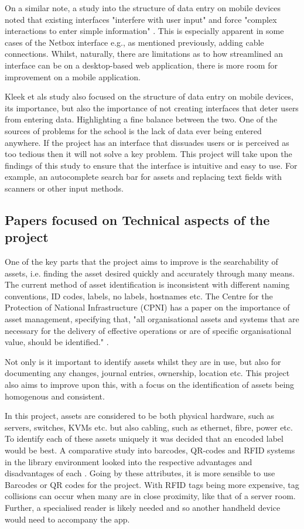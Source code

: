 \documentclass [11pt,a4paper]{article}
\begin{document}
On a similar note, a study into the structure of data entry on mobile devices noted that existing interfaces "interfere with user input" and force "complex interactions to enter simple information" \cite{van2007gui}. This is especially apparent in some cases of the Netbox interface e.g., as mentioned previously, adding cable connections. Whilst, naturally, there are limitations as to how streamlined an interface can be on a desktop-based web application, there is more room for improvement on a mobile application.

Kleek et als \cite{van2007gui} study also focused on the structure of data entry on mobile devices, its importance, but also the importance of not creating interfaces that deter users from entering data. Highlighting a fine balance between the two. One of the sources of problems for the school is the lack of data ever being entered anywhere. If the project has an interface that dissuades users or is perceived as too tedious then it will not solve a key problem. This project will take upon the findings of this study to ensure that the interface is intuitive and easy to use. For example, an autocomplete search bar for assets and replacing text fields with scanners or other input methods. 

\subsection{Papers focused on Technical aspects of the project}
\label{sec:technical}

One of the key parts that the project aims to improve is the searchability of assets, i.e. finding the asset desired quickly and accurately through many means. The current method of asset identification is inconsistent with different naming conventions, ID codes, labels, no labels, hostnames etc. The Centre for the Protection of National Infrastructure (CPNI) has a paper on the importance of asset management, specifying that, "all organisational assets and systems that are necessary for the delivery of effective operations or are of specific organisational value, should be identified." \cite{cpni}.

Not only is it important to identify assets whilst they are in use, but also for documenting any changes, journal entries, ownership, location etc. This project also aims to improve upon this, with a focus on the identification of assets being homogenous and consistent.

In this project, assets are considered to be both physical hardware, such as servers, switches, KVMs etc. but also cabling, such as ethernet, fibre, power etc. To identify each of these assets uniquely it was decided that an encoded label would be best. A comparative study into barcodes, QR-codes and RFID systems in the library environment looked into the respective advantages and disadvantages of each \cite{lotlikar2013comparative}. Going by these attributes, it is more sensible to use Barcodes or QR codes for the project. With RFID tags being more expensive, tag collisions can occur when many are in close proximity\cite{lotlikar2013comparative}, like that of a server room. Further, a specialised reader is likely needed and so another handheld device would need to accompany the app.
\end{document}
